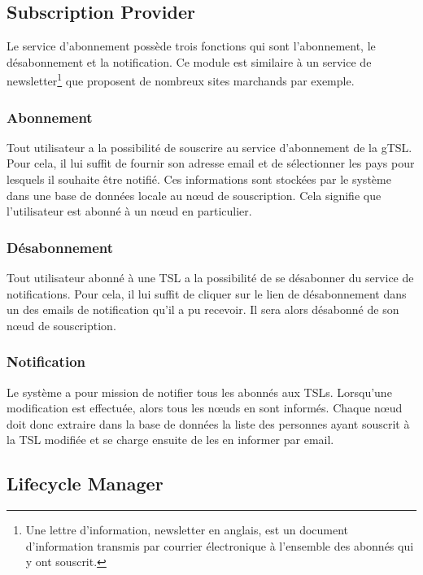 \documentclass{tnreport}
\begin{document}
\subsection{Subscription Provider}

Le service d'abonnement possède trois fonctions qui sont l'abonnement, le désabonnement et la notification. Ce module est similaire à un service de newsletter\footnote{Une lettre d'information, newsletter en anglais, est un document d'information transmis par courrier électronique à l'ensemble des abonnés qui y ont souscrit.} que proposent de nombreux sites marchands par exemple.

\subsubsection{Abonnement}

Tout utilisateur a la possibilité de souscrire au service d'abonnement de la gTSL. Pour cela, il lui suffit de fournir son adresse email et de sélectionner les pays pour lesquels il souhaite être notifié. Ces informations sont stockées par le système dans une base de données locale au nœud de souscription. Cela signifie que l'utilisateur est abonné à un nœud en particulier.

\subsubsection{Désabonnement}

Tout utilisateur abonné à une TSL a la possibilité de se désabonner du service de notifications. Pour cela, il lui suffit de cliquer sur le lien de désabonnement dans un des emails de notification qu'il a pu recevoir. Il sera alors désabonné de son nœud de souscription.

\subsubsection{Notification}

Le système a pour mission de notifier tous les abonnés aux TSLs. Lorsqu'une modification est effectuée, alors tous les nœuds en sont informés. Chaque nœud doit donc extraire dans la base de données la liste des personnes ayant souscrit à la TSL modifiée et se charge ensuite de les en informer par email.

\subsection{Lifecycle Manager}
\end{document}
